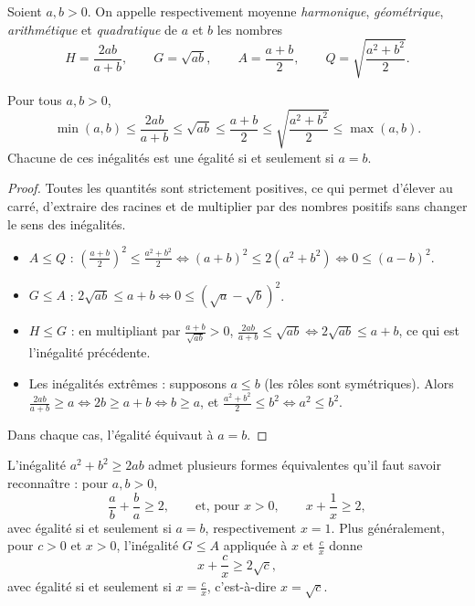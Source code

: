 \documentclass[11pt]{article}
\begin{document}
\begin{definition}
Soient $a, b > 0$. On appelle respectivement moyenne \emph{harmonique},
\emph{géométrique}, \emph{arithmétique} et \emph{quadratique} de $a$ et $b$
les nombres
\[
H = \frac{2ab}{a+b}, \qquad G = \sqrt{ab}, \qquad A = \frac{a+b}{2},
\qquad Q = \sqrt{\frac{a^2+b^2}{2}} .
\]
\end{definition}

\begin{theoreme}\label{thm:moy2}
Pour tous $a, b > 0$,
\[
\min(a, b) \leqslant \frac{2ab}{a+b} \leqslant \sqrt{ab} \leqslant \frac{a+b}{2}
\leqslant \sqrt{\frac{a^2+b^2}{2}} \leqslant \max(a, b).
\]
Chacune de ces inégalités est une égalité si et seulement si $a = b$.
\end{theoreme}

\begin{proof}
Toutes les quantités sont strictement positives, ce qui permet d'élever au
carré, d'extraire des racines et de multiplier par des nombres positifs sans
changer le sens des inégalités.
\begin{itemize}
  \item $A \leqslant Q$ : $\left(\frac{a+b}{2}\right)^2 \leqslant \frac{a^2+b^2}{2}
  \iff (a+b)^2 \leqslant 2(a^2 + b^2) \iff 0 \leqslant (a-b)^2$.
  \item $G \leqslant A$ : $2\sqrt{ab} \leqslant a + b \iff
  0 \leqslant \left(\sqrt a - \sqrt b\right)^2$.
  \item $H \leqslant G$ : en multipliant par $\frac{a+b}{\sqrt{ab}} > 0$,
  $\frac{2ab}{a+b} \leqslant \sqrt{ab} \iff 2\sqrt{ab} \leqslant a + b$,
  ce qui est l'inégalité précédente.
  \item Les inégalités extrêmes : supposons $a \leqslant b$ (les rôles sont
  symétriques). Alors $\frac{2ab}{a+b} \geqslant a \iff 2b \geqslant a + b
  \iff b \geqslant a$, et $\frac{a^2 + b^2}{2} \leqslant b^2 \iff a^2 \leqslant b^2$.
\end{itemize}
Dans chaque cas, l'égalité équivaut à $a = b$.
\end{proof}

\begin{remarque}
L'inégalité $a^2 + b^2 \geqslant 2ab$ admet plusieurs formes équivalentes
qu'il faut savoir reconnaître : pour $a, b > 0$,
\[
\frac ab + \frac ba \geqslant 2, \qquad\text{et, pour } x > 0,\qquad
x + \frac1x \geqslant 2 ,
\]
avec égalité si et seulement si $a = b$, respectivement $x = 1$. Plus
généralement, pour $c > 0$ et $x > 0$, l'inégalité $G \leqslant A$
appliquée à $x$ et $\frac cx$ donne
\[
x + \frac cx \geqslant 2\sqrt c ,
\]
avec égalité si et seulement si $x = \frac cx$, c'est-à-dire $x = \sqrt c$.
\end{remarque}
\end{document}
